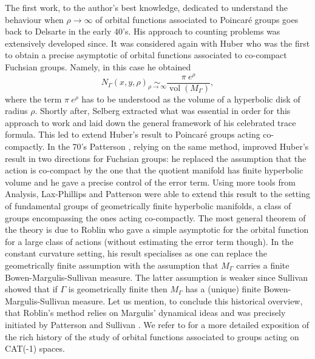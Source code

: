 \documentclass[10pt]{amsart}
\theoremstyle{plain}
\theoremstyle{definition}
\newcommand{\equivaut}[1]{\underset{#1}{\sim}}
\DeclareMathOperator{\vol}{vol}
\begin{document}
The first work, to the author's best knowledge, dedicated to understand the behaviour when $\rho \to \infty$ of orbital functions associated to Poincaré groups goes back to Delsarte \cite{artdelsarte} in the early 40's. His approach to counting problems was extensively developed since. It was considered again with Huber \cite{arthuber2} who was the first to obtain a precise asymptotic of orbital functions associated to co-compact Fuchsian groups. Namely, in this case he obtained
\[
N_{\Gamma}(x,y,\rho) \equivaut{\rho \to \infty} \frac{\pi \ e^{\rho}}{\vol(M_{\Gamma})},
\]
where the term $\pi \ e^{\rho}$ has to be understood as the volume of a hyperbolic disk of radius $\rho$. Shortly after, Selberg \cite{artselberg2,artselberg} extracted what was essential in order for this approach to work and laid down the general framework of his celebrated trace formula. This led to extend Huber's result to Poincaré groups acting co-compactly. In the 70's Patterson \cite{artpattersontermeerror}, relying on the same method, improved Huber's result in two directions for Fuchsian groups: he replaced the assumption that the action is co-compact by the one that the quotient manifold has finite hyperbolic volume and he gave a precise control of the error term. Using more tools from Analysis, Lax-Phillips \cite{articlelax} and Patterson \cite{articlepatteron2} were able to extend this result to the setting of fundamental groups of geometrically finite hyperbolic manifolds, a class of groups encompassing the ones acting co-compactly. The most general theorem of the theory is due to Roblin \cite{memoireroblin} who gave a simple asymptotic for the orbital function for a large class of actions (without estimating the error term though). In the constant curvature setting, his result specialises as one can replace the geometrically finite assumption with the assumption that $M_{\Gamma}$ carries a finite Bowen-Margulis-Sullivan measure. The latter assumption is weaker since Sullivan showed \cite{artsullivanmesurebms} that if $\Gamma$ is geometrically finite then $M_\Gamma$ has a (unique) finite Bowen-Margulis-Sullivan measure. Let us mention, to conclude this historical overview, that Roblin's method relies on Margulis' dynamical ideas \cite{artmargulismixing} and was precisely initiated by Patterson \cite{arttersondensiteconforme} and Sullivan \cite{artsullivandensiteconforme, artsullivanmesurebms}. We refer to \cite{livremartine} for a more detailed exposition of the rich history of the study of orbital functions associated to groups acting on CAT(-1) spaces.
\end{document}
